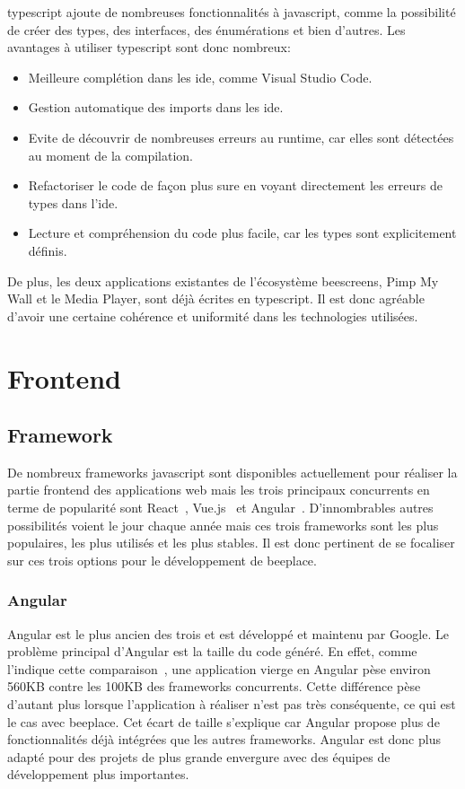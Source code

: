 \gls{typescript} ajoute de nombreuses fonctionnalités à \gls{javascript}, comme la possibilité de créer des types, des interfaces, des énumérations et bien d'autres. Les avantages à utiliser \gls{typescript} sont donc nombreux:

\begin{itemize}
  \item Meilleure complétion dans les \gls{ide}, comme Visual Studio Code.
  \item Gestion automatique des imports dans les \gls{ide}.
  \item Evite de découvrir de nombreuses erreurs au runtime, car elles sont détectées au moment de la compilation.
  \item Refactoriser le code de façon plus sure en voyant directement les erreurs de types dans l'\gls{ide}.
  \item Lecture et compréhension du code plus facile, car les types sont explicitement définis.
\end{itemize}

De plus, les deux applications existantes de l'écosystème \gls{beescreens}, Pimp My Wall et le Media Player, sont déjà écrites en \gls{typescript}. Il est donc agréable d'avoir une certaine cohérence et uniformité dans les technologies utilisées.

\section{Frontend}

\subsection{Framework}

De nombreux frameworks \gls{javascript} sont disponibles actuellement pour réaliser la partie frontend des applications web mais les trois principaux concurrents en terme de popularité sont React~\cite{react}, Vue.js~\cite{vue} et Angular~\cite{angular}. D'innombrables autres possibilités voient le jour chaque année mais ces trois frameworks sont les plus populaires, les plus utilisés et les plus stables. Il est donc pertinent de se focaliser sur ces trois options pour le développement de \gls{beeplace}.

\subsubsection{Angular}

Angular est le plus ancien des trois et est développé et maintenu par Google. Le problème principal d'Angular est la taille du code généré. En effet, comme l'indique cette comparaison~\cite{comparison-js-frameworks}, une application vierge en Angular pèse environ 560KB contre les 100KB des frameworks concurrents. Cette différence pèse d'autant plus lorsque l'application à réaliser n'est pas très conséquente, ce qui est le cas avec \gls{beeplace}. Cet écart de taille s'explique car Angular propose plus de fonctionnalités déjà intégrées que les autres frameworks. Angular est donc plus adapté pour des projets de plus grande envergure avec des équipes de développement plus importantes.

